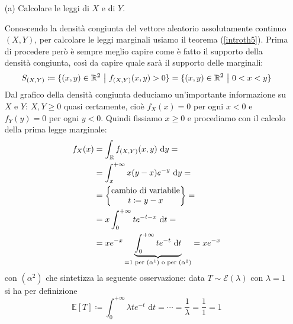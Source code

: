 \Soluzione{}
\begin{enumerate}
\item [(a)] Calcolare le leggi di $X$ e di $Y$.

Conoscendo la densità congiunta del vettore aleatorio assolutamente continuo $(X,Y)$, per calcolare le leggi marginali usiamo il teorema (\ref{introth5}). Prima di procedere però è sempre meglio capire come è fatto il supporto della densità congiunta, così da capire quale sarà il supporto delle marginali:
\[
S_{(X,Y)}\coloneqq\{(x,y)\in\RR^2\ \big|\ \fXYxy>0   \}=\{(x,y)\in\RR^2\ \big|\ 0<x<y   \}
\]
Dal grafico della densità congiunta deduciamo un'importante informazione su $X$ e $Y$: $X,Y\geq 0$ quasi certamente, cioè $f_X(x)=0$ per ogni $x<0$ e $f_Y(y)=0$ per ogni $y<0$. Quindi fissiamo $x\geq 0$ e procediamo con il calcolo della prima legge marginale:
\begin{gather*}
\begin{aligned}
f_X(x)&=\int_{\mathbb{R}} f_{(X,Y)}(x,y)\text{ d}y= \\
&=\int_x^{+\infty}x(y-x)e^{-y}\text{ d}y= \\
&=\begin{Bmatrix}
\text{cambio di variabile}\\t\coloneqq y-x 
\end{Bmatrix}= \\
&=x\int_0^{+\infty}te^{-t-x}\text{ d}t=\\
&=xe^{-x}\underbrace{\int_0^{+\infty}te^{-t}\text{ d}t}_{=1 \text{ per } (\alpha^1)\text{ o per }(\alpha^2)}=xe^{-x}
\end{aligned}
\end{gather*}
con $(\alpha^2)$ che sintetizza la seguente osservazione: data $T\sim\mathcal{E}(\lambda)$ con $\lambda=1$ si ha per definizione
\begin{equation*}
\mathbb{E}[T]\coloneqq\int_0^{+\infty}\lambda te^{-t}\text{ d}t=\cdots=\frac{1}{\lambda}=\frac{1}{1}=1
\end{equation*}


\end{enumerate}
